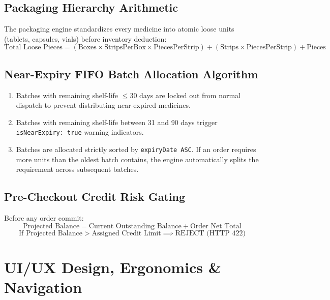 \documentclass[10pt,a4paper]{article}
\begin{document}
\subsection{Packaging Hierarchy Arithmetic}
The packaging engine standardizes every medicine into atomic loose units (tablets, capsules, vials) before inventory deduction:
\begin{equation}
\text{Total Loose Pieces} = (\text{Boxes} \times \text{StripsPerBox} \times \text{PiecesPerStrip}) + (\text{Strips} \times \text{PiecesPerStrip}) + \text{Pieces}
\end{equation}

\subsection{Near-Expiry FIFO Batch Allocation Algorithm}
\begin{enumerate}[leftmargin=*]
    \item Batches with remaining shelf-life $\le 30$ days are locked out from normal dispatch to prevent distributing near-expired medicines.
    \item Batches with remaining shelf-life between 31 and 90 days trigger \texttt{isNearExpiry: true} warning indicators.
    \item Batches are allocated strictly sorted by \texttt{expiryDate ASC}. If an order requires more units than the oldest batch contains, the engine automatically splits the requirement across subsequent batches.
\end{enumerate}

\subsection{Pre-Checkout Credit Risk Gating}
Before any order commit:
\begin{equation}
\text{Projected Balance} = \text{Current Outstanding Balance} + \text{Order Net Total}
\end{equation}
\begin{equation}
\text{If Projected Balance} > \text{Assigned Credit Limit} \implies \text{REJECT (HTTP 422)}
\end{equation}

\section{UI/UX Design, Ergonomics \& Navigation}
\end{document}
